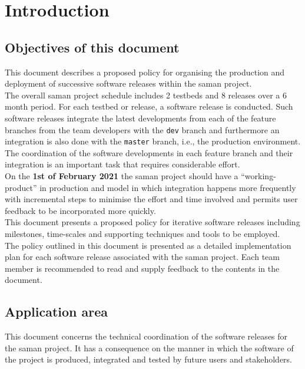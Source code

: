 \section{Introduction}

\subsection{Objectives of this document}

\noindent This document describes a proposed policy for organising the production and deployment of successive software releases within the saman project.\\

\noindent The overall saman project schedule includes 2 testbeds and 8 releases over a 6 month period. For each testbed or release, a software release is conducted. Such software releases integrate the latest developments from each of the feature branches from the team developers with the \texttt{dev} branch and furthermore an integration is also done with the \texttt{master} branch, i.e., the production environment.\\

\noindent The coordination of the software developments in each feature branch and their integration is an important task that requires considerable effort.\\

\noindent On the \textbf{1st of February 2021} the saman project should have a “working-product” in production and model in which integration happens more frequently with incremental steps to minimise the effort and time involved and permits user feedback to be incorporated more quickly.\\

\noindent This document presents a proposed policy for iterative software releases including milestones, time-scales and supporting techniques and tools to be employed.\\

\noindent The policy outlined in this document is presented as a detailed implementation plan for each software release associated with the saman project. Each team member is recommended to read and supply feedback to the contents in the document.

\subsection{Application area}

\noindent This document concerns the technical coordination of the software releases for the saman project. It has a consequence on the manner in which the software of the project is produced, integrated and tested by future users and stakeholders.


